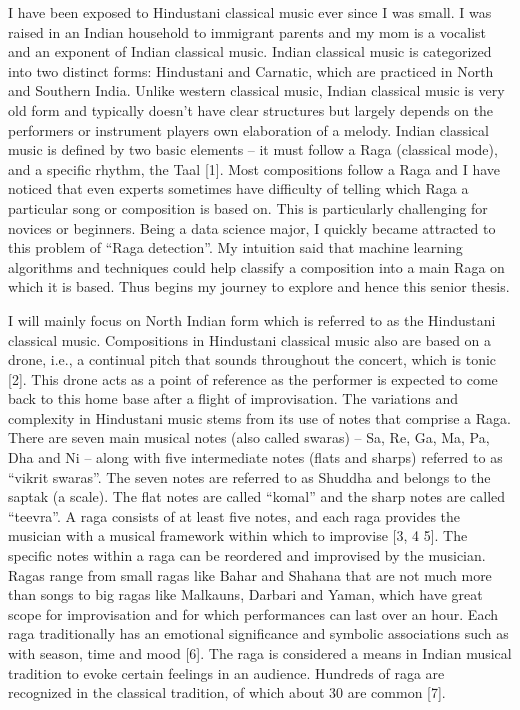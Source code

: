 \doublespacing
\setlength{\parindent}{1cm}

\par

I have been exposed to Hindustani classical music ever since I was small. I was raised in an Indian household to immigrant parents and my mom is a vocalist and an exponent of Indian classical music. Indian classical music is categorized into two distinct forms: Hindustani and Carnatic, which are practiced in North and Southern India. Unlike western classical music, Indian classical music is very old form and typically doesn’t have clear structures but largely depends on the performers or instrument players own elaboration of a melody. Indian classical music is defined by two basic elements – it must follow a Raga (classical mode), and a specific rhythm, the Taal [1]. Most compositions follow a Raga and I have noticed that even experts sometimes have difficulty of telling which Raga a particular song or composition is based on. This is particularly challenging for novices or beginners. Being a data science major, I quickly became attracted to this problem of “Raga detection”. My intuition said that machine learning algorithms and techniques could help classify a composition into a main Raga on which it is based. Thus begins my journey to explore and hence this senior thesis. \par

I will mainly focus on North Indian form which is referred to as the Hindustani classical music. Compositions in Hindustani classical music also are based on a drone, i.e., a continual pitch that sounds throughout the concert, which is tonic [2]. This drone acts as a point of reference as the performer is expected to come back to this home base after a flight of improvisation. The variations and complexity in Hindustani music stems from its use of notes that comprise a Raga. There are seven main musical notes (also called swaras) – Sa, Re, Ga, Ma, Pa, Dha and Ni – along with five intermediate notes (flats and sharps) referred to as “vikrit swaras”. The seven notes are referred to as Shuddha and belongs to the saptak (a scale). The flat notes are called “komal” and the sharp notes are called “teevra”. A raga consists of at least five notes, and each raga provides the musician with a musical framework within which to improvise [3, 4 5]. The specific notes within a raga can be reordered and improvised by the musician. Ragas range from small ragas like Bahar and Shahana that are not much more than songs to big ragas like Malkauns, Darbari and Yaman, which have great scope for improvisation and for which performances can last over an hour. Each raga traditionally has an emotional significance and symbolic associations such as with season, time and mood [6].  The raga is considered a means in Indian musical tradition to evoke certain feelings in an audience. Hundreds of raga are recognized in the classical tradition, of which about 30 are common [7]. \par


